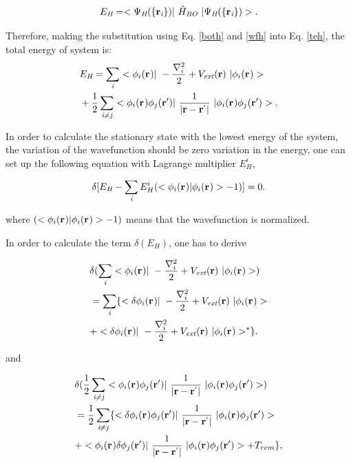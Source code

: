 \documentclass[a4paper, 12pt, titlepage,oneside,drop]{kthesis}
\begin{document}
\begin{equation}\label{teh}
E_{\textit{H}} = <\Psi_{{\textit H}}(\{ {\textbf r}_{{\textit i}}\}) |\ {\hat{H}}_{\textit{BO}} \ | \Psi_{{\textit H}}(\{ {\textbf r}_{{\textit i}}\})  >.
\end{equation}

Therefore, making the substitution using Eq. \ref{both} and \ref{wfh} into Eq. \ref{teh}, the total energy of system is:
\begin{equation}\begin{split}
&E_\textit{H} = \sumi<i> <\bwf<i><> |\ -\frac{\nabla^{2}_{i}}{2} + V_\textit{ext}(\textbf{r})  \ | \bwf<i><> > \\
& +\frac{1}{2} \suminj<i><j> <\bwf<i><> \bwfn<j><'>|\ \frac{1}{|\textbf{r} - \textbf{r}^{'} |} \ | \bwf<i><> \bwfn<j><'>>.
\end{split}\end{equation}

In order to calculate the stationary state with the lowest energy of the system, the variation of the wavefunction should be
zero variation in the energy, one can set up the following equation with Lagrange multiplier $E^{i}_H$,

\begin{equation}\label{haa}
 \delta [ E_{\textit{H}} - \sumi<i> E^{i}_{H} (<\bwf<i><> | \bwf<i><> > -1)] = 0. 
\end{equation}

where $(<\bwf<i><> | \bwf<i><> > -1)$ means that the wavefunction is normalized.

In order to calculate the term $\delta ( E_{\textit{H}} ) $, one has to derive

\begin{equation}\begin{split}\label{hartree1}
& \delta ( \sumi<i> <\bwf<i><> |\ -\frac{\nabla^{2}_{ i}}{2} + V_\textit{ext}(\textbf{r})  \ | \bwf<i><> > ) \\
&  = \sumi<i> \{ < \delta \bwf<i><> |\ -\frac{\nabla^{2}_{i}}{2} + V_\textit{ext}(\textbf{r})  \ | \bwf<i><> >  \\
&  + <  \delta \bwf<i><> |\ -\frac{\nabla^{2}_{i}}{2} + V_\textit{ext}(\textbf{r})  \ |  \bwf<i><> >^{\ast} \}.
\end{split}\end{equation}

and 

\begin{equation}\begin{split}\label{hartree2}
&  \delta( \frac{1}{2} \suminj<i><j> <\bwf<i><> \bwfn<j><'>|\ \frac{1}{|\textbf{r} - \textbf{r}^{'} |} \ | \bwf<i><> \bwfn<j><'>>)   \\
& =   \frac{1}{2} \suminj<i><j> \{  <\delta \bwf<i><> \bwfn<j><'>|\ \frac{1}{|\textbf{r} - \textbf{r}^{'} |} \ | \bwf<i><> \bwfn<j><'>>  \\
& +   < \bwf<i><> \delta \bwfn<j><'>|\ \frac{1}{|\textbf{r} - \textbf{r}^{'} |} \ | \bwf<i><> \bwfn<j><'>> +  T_{rem}\},
\end{split}\end{equation}
\end{document}
